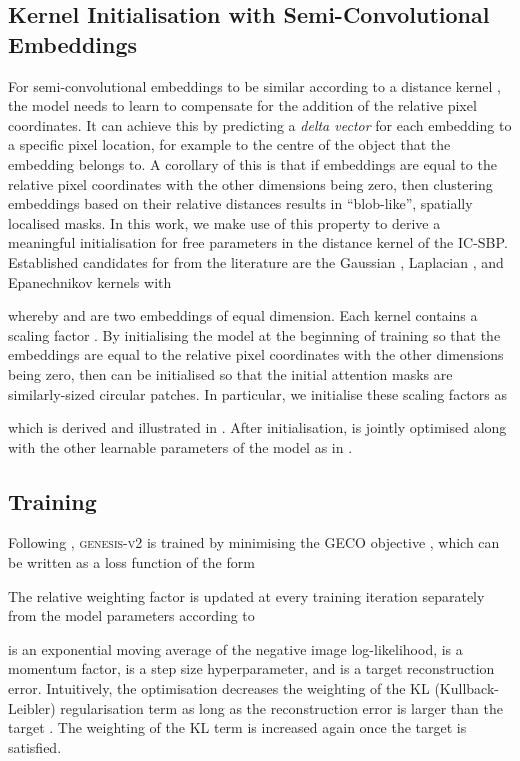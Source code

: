 \documentclass{article}
\begin{document}
\subsection{Kernel Initialisation with Semi-Convolutional Embeddings}
\label{sec:semiconv}
For semi-convolutional embeddings to be similar according to a distance kernel , the model needs to learn to compensate for the addition of the relative pixel coordinates.
It can achieve this by predicting a \emph{delta vector} for each embedding to a specific pixel location, for example to the centre of the object that the embedding belongs to.
A corollary of this is that if embeddings are equal to the relative pixel coordinates with the other dimensions being zero, then clustering embeddings based on their relative distances results in ``blob-like'', spatially localised masks.
In this work, we make use of this property to derive a meaningful initialisation for free parameters in the distance kernel  of the IC-SBP.
Established candidates for  from the literature are the Gaussian  \cite{novotny2018semi}, Laplacian  \cite{novotny2018semi}, and Epanechnikov  kernels \cite{kong2018recurrent} with

whereby  and  are two embeddings of equal dimension.
Each kernel contains a scaling factor .
By initialising the model at the beginning of training so that the embeddings are equal to the relative pixel coordinates with the other dimensions being zero, then  can be initialised so that the initial attention masks are similarly-sized circular patches.
In particular, we initialise these scaling factors as

which is derived and illustrated in .
After initialisation,  is jointly optimised along with the other learnable parameters of the model as in \citet{novotny2018semi}.

\subsection{Training}
\label{sec:training}
Following \citet{engelcke2020genesis}, \textsc{genesis-v2} is trained by minimising the GECO objective \cite{rezende2018taming}, which can be written as a loss function of the form

The relative weighting factor  is updated at every training iteration separately from the model parameters according to

 is an exponential moving average of the negative image log-likelihood,  is a momentum factor,  is a step size hyperparameter, and  is a target reconstruction error.
Intuitively, the optimisation decreases the weighting of the KL (Kullback-Leibler) regularisation term as long as the reconstruction error is larger than the target .
The weighting of the KL term is increased again once the target is satisfied.
\end{document}

